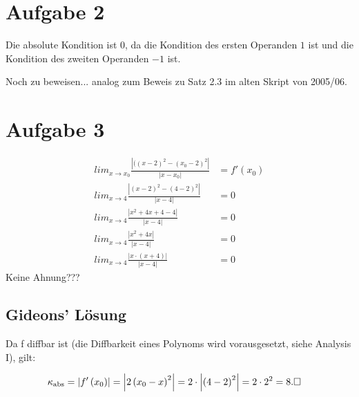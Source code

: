 \documentclass{llncs}
\begin{document}
\section*{Aufgabe 2}

Die absolute Kondition ist $0$, da die Kondition des ersten Operanden $1$ ist und die Kondition des zweiten Operanden $-1$ ist.

Noch zu beweisen...
analog zum Beweis zu Satz 2.3 im alten Skript von 2005/06.

\section*{Aufgabe 3}

\begin{align*}
lim_{x \rightarrow x_0} \frac{|((x-2)^2 - (x_0-2)^2|}{|x-x_0|} &= f'(x_0) \\
lim_{x \rightarrow 4} \frac{|(x-2)^2 - (4-2)^2|}{|x-4|} &= 0 \\
lim_{x \rightarrow 4} \frac{|x^2 + 4x + 4 - 4|}{|x-4|} &= 0 \\
lim_{x \rightarrow 4} \frac{|x^2 + 4x|}{|x-4|} &= 0 \\
lim_{x \rightarrow 4} \frac{|x \cdot (x + 4)|}{|x-4|} &= 0
\end{align*}
Keine Ahnung???

\subsection*{Gideons' L\"osung}

Da f diffbar ist (die Diffbarkeit eines Polynoms wird vorausgesetzt, siehe Analysis I), gilt:

\begin{align}
\kappa_{\text{abs}} = \left|f'\left(x_0\right)\right| = \left|2\left(x_0-x\right)^2\right| 
= 2\cdot\left|\left(4-2\right)^2\right| = 2\cdot 2^2 = 8. &\hfill \square
\end{align}
\end{document}
